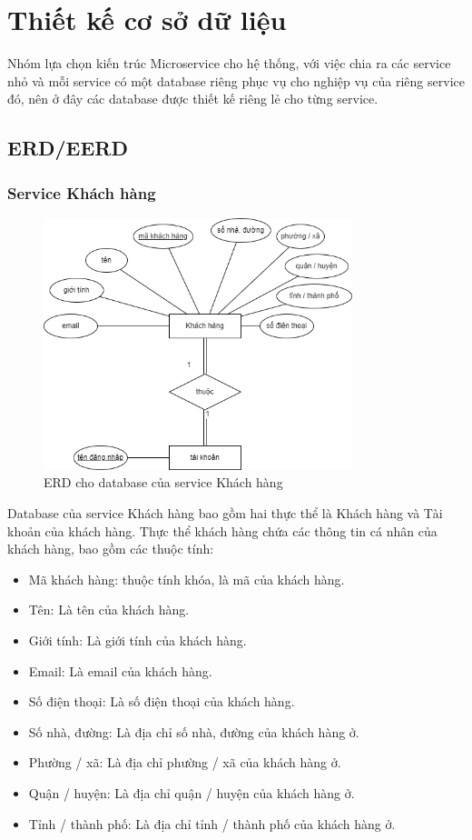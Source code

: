 \section{Thiết kế cơ sở dữ liệu}
\par Nhóm lựa chọn kiến trúc Microservice cho hệ thống, với việc chia ra các service nhỏ và mỗi service có một database riêng phục vụ cho nghiệp vụ của riêng service đó, nên ở đây các database được thiết kế riêng lẻ cho từng service.
 
\subsection{ERD/EERD}
\subsubsection{Service Khách hàng}
\begin{figure}[!htp]
    \begin{center}
        \includegraphics[width=9cm]{img/database/erd/eerd-customer.png}
        \newline
        \caption{ERD cho database của service Khách hàng}
    \end{center}
\end{figure}
 
\par Database của service Khách hàng bao gồm hai thực thể là Khách hàng và Tài khoản của khách hàng. Thực thể khách hàng chứa các thông tin cá nhân của khách hàng, bao gồm các thuộc tính:
\begin{itemize}
    \item Mã khách hàng: thuộc tính khóa, là mã của khách hàng.
    \item Tên: Là tên của khách hàng.
    \item Giới tính: Là giới tính của khách hàng.
    \item Email: Là email của khách hàng.
    \item Số điện thoại: Là số điện thoại của khách hàng.
    \item Số nhà, đường: Là địa chỉ số nhà, đường của khách hàng ở.
    \item Phường / xã: Là địa chỉ phường / xã của khách hàng ở.
    \item Quận / huyện: Là địa chỉ quận / huyện của khách hàng ở.
    \item Tỉnh / thành phố: Là địa chỉ tỉnh / thành phố của khách hàng ở.
\end{itemize}
 
